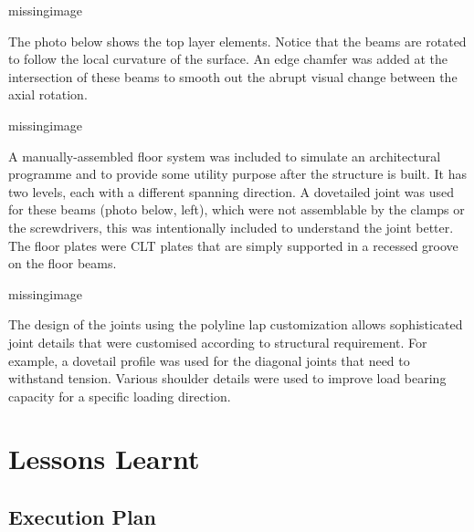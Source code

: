missingimage

The photo below shows the top layer elements. Notice that the beams are rotated to follow the local curvature of the surface. An edge chamfer was added at the intersection of these beams to smooth out the abrupt visual change between the axial rotation.

missingimage

A manually-assembled floor system was included to simulate an architectural programme and to provide some utility purpose after the structure is built. It has two levels, each with a different spanning direction. A dovetailed joint was used for these beams (photo below, left), which were not assemblable by the clamps or the screwdrivers, this was intentionally included to understand the joint better. The floor plates were CLT plates that are simply supported in a recessed groove on the floor beams.

missingimage

The design of the joints using the polyline lap customization allows sophisticated joint details that were customised according to structural requirement. For example, a dovetail profile was used for the diagonal joints that need to withstand tension. Various shoulder details were used to improve load bearing capacity for a specific loading direction.


\section{Lessons Learnt}
\label{section:exploration-4-lessons-learnt}

\subsection{Execution Plan}
\label{subsection:exploration-4-execution-plan}


